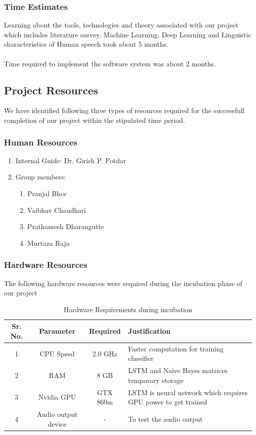 \documentclass[oneside,a4paper,12pt]{book}
\begin{document}
\subsubsection{Time Estimates}
Learning about the tools, technologies and theory associated with our project which includes literature survey, Machine Learning, Deep Learning and Linguistic characteristics of Human speech took about 5 months.\\\\
Time required to implement the software system was about 2 months.



\subsection{Project Resources}
We have identified following three types of resources required for the successfull completion of our project within the stipulated time period.

	\subsubsection{Human Resources}
		\begin{enumerate}
			\item Internal Guide: Dr. Girish P. Potdar
			\item Group members:
				\begin{enumerate}[i]
					\item Pranjal Bhor
					\item Vaibhav Chaudhari
					\item Prathamesh Dharangutte
					\item Murtaza Raja
				\end{enumerate}
		\end{enumerate}
	
	\subsubsection{Hardware Resources}
		The following hardware resources were required during the incubation phase of our project
		\begin{table}[!htbp]
			\begin{center}
				\def\arraystretch{1.5}
				\begin{tabularx}{\textwidth}{| c | c | c | X |}
					\hline
					Sr. No. &	Parameter &	Required & Justification \\
					\hline
					1 &	CPU Speed &	 2.0 GHz  & Faster computation for training classifier\\
					\hline
					2 &	RAM  &	8 GB &  LSTM and Naive Bayes matrices temporary storage\\
					\hline
					3 & Nvidia GPU & GTX 860m & LSTM is neural network which requires GPU power to get trained\\
					\hline
					4 & Audio output device & - & To test the audio output\\
					\hline
				\end{tabularx}
				\caption { Hardware Requirements during incubation}
				\label{tab:incubhreq}
			\end{center}
			
		\end{table}
	\newpage
\end{document}
